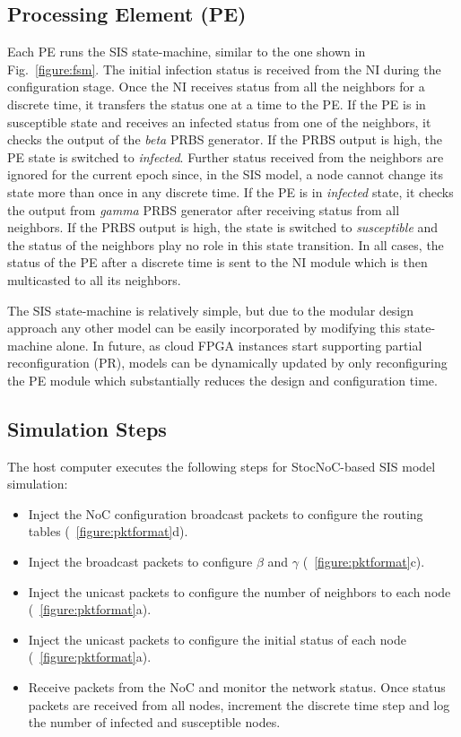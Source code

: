 \subsection{Processing Element (PE)}

Each PE runs the SIS state-machine, similar to the one shown in Fig.~\ref{figure:fsm}.
The initial infection status is received from the NI during the configuration stage.
Once the NI receives status from all the neighbors for a discrete time, it transfers the status one at a time to the PE.
If the PE is in susceptible state and receives an infected status from one of the neighbors, it checks the output of the \emph{beta} PRBS generator.
If the PRBS output is high, the PE state is switched to \emph{infected}.
Further status received from the neighbors are ignored for the current epoch since, in the SIS model, a node cannot change its state more than once in any discrete time. 
If the PE is in \emph{infected} state, it checks the output from \emph{gamma} PRBS generator after receiving status from all neighbors.
If the PRBS output is high, the state is switched to \emph{susceptible} and the status of the neighbors play no role in this state transition.
In all cases, the status of the PE after a discrete time is sent to the NI module which is then multicasted to all its neighbors.

The SIS state-machine is relatively simple, but due to the modular design approach any other model can be easily incorporated by modifying this state-machine alone.
In future, as cloud FPGA instances start supporting partial reconfiguration (PR), models can be dynamically updated by only reconfiguring the PE module which substantially reduces the design and configuration time.



\subsection{Simulation Steps}
The host computer executes the following steps for StocNoC-based SIS model simulation:
\begin{itemize}
	\item Inject the NoC configuration broadcast packets to configure the routing tables (\figurename{~\ref{figure:pktformat}d}).
\item Inject the broadcast packets to configure $\beta$ and $\gamma$ (\figurename{~\ref{figure:pktformat}c}).
\item Inject the unicast packets to configure the number of neighbors to each node (\figurename{~\ref{figure:pktformat}a}).
\item Inject the unicast packets to configure the initial status of each node (\figurename{~\ref{figure:pktformat}a}).
\item Receive packets from the NoC and monitor the network status. Once status packets are received from all nodes, increment the discrete time step and log the number of infected and susceptible nodes.
\end{itemize}